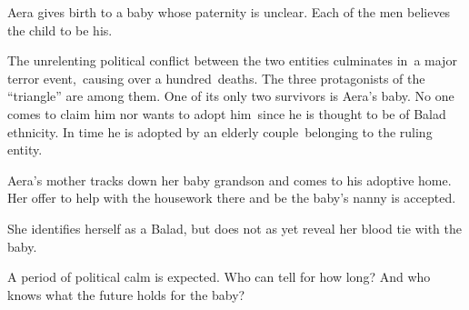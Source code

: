 \documentclass[
  spinewidth=0.8325in,
  coverwidth=6in,
  coverheight=9in,
  marklength=0.125in,
  bleedwidth=0.125in,
  11pt
]{bookcover}
\begin{document}
\begin{bookcover}
{{Aera gives birth to a baby whose paternity is unclear. Each of the men
believes the child to be his.

The unrelenting political conflict between the two entities culminates
in~a major terror event,\ causing over a hundred\ deaths. The three
protagonists of the ``triangle'' are among them. One of its only two
survivors is Aera's baby. No one comes to claim him nor wants to adopt
him\ since he is thought to be of Balad ethnicity. In time he is
adopted by an elderly couple~belonging to the ruling entity.

Aera's mother tracks down her baby grandson and comes to his adoptive
home. Her offer to help with the housework there and be the baby's
nanny is accepted.

\bigskip

She identifies herself as a Balad, but does not as yet reveal her
blood tie with the baby.

A period of political calm is expected. Who can tell for how long?
And who knows what the future holds for the baby?

    }


}


\end{bookcover}
\end{document}
